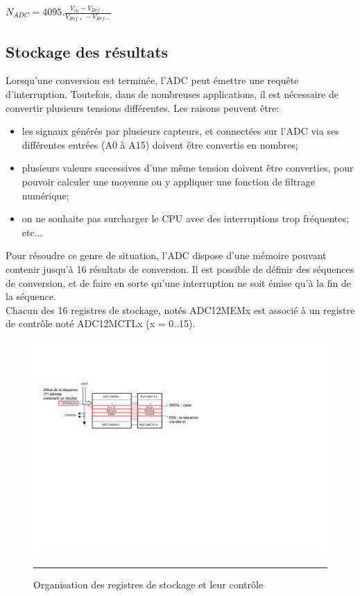 \begin{tabbing}
\begin{Large}
\qquad $N_{ADC}=4095.\frac{V_{in}-V_{Ref-}}{V_{Ref+}-V_{Ref-}}$
\end{Large}
\end{tabbing}


\subsection{Stockage des résultats}
Lorsqu'une conversion est terminée, l'ADC peut émettre une requête d'interruption. Toutefois, dans de nombreuses applications, il est nécessaire de convertir plusieurs tensions différentes. Les raisons peuvent être:
\begin{itemize}[label=\textbullet,font=\small]
\item les signaux générés par plusieurs capteurs, et connectées sur l'ADC via ses différentes entrées (A0 à A15) doivent être convertis en nombres;
\item plusieurs valeurs successives d'une même tension doivent être converties, pour pouvoir calculer une moyenne ou y appliquer une fonction de filtrage numérique;
\item on ne souhaite pas surcharger le CPU avec des interruptions trop fréquentes;
etc...
\end{itemize}

Pour résoudre ce genre de situation, l'ADC dispose d'une mémoire pouvant contenir jusqu'à 16 résultats de conversion. Il est possible de définir des séquences de conversion, et de faire en sorte qu'une interruption ne soit émise qu'à la fin de la séquence.\\
Chacun des 16 registres de stockage, notés ADC12MEMx est associé à un registre de contrôle noté ADC12MCTLx (x = 0..15).

\begin{figure}[H]
  \centering
  \includegraphics [angle=0, width=14cm]{./Figures/Chap11_ADC/ADC12Stockage.pdf}
  \rule{35em}{0.5pt}
  \caption{Organisation des registres de stockage et leur contrôle}
  \label{fig:ADC12Stockage}
\end{figure}

